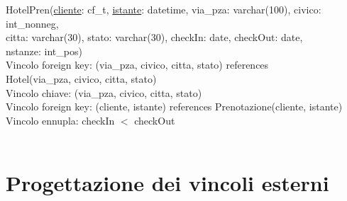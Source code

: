 \documentclass[a4paper,12pt]{report}
\begin{document}
      \hspace*{-0.75cm}
      HotelPren(\underline{cliente}: cf\_t, \underline{istante}: datetime, via\_pza: varchar(100), civico: int\_nonneg, \\
      \hspace*{2cm}citta: varchar(30), stato: varchar(30), checkIn: date, checkOut: date, \\
      \hspace*{2cm}nstanze: int\_pos) \\
      \hspace*{1cm} Vincolo foreign key: (via\_pza, civico, citta, stato) references \\
      \hspace*{2cm}Hotel(via\_pza, civico, citta, stato) \\
      \hspace*{1cm} Vincolo chiave: (via\_pza, civico, citta, stato) \\
      \hspace*{1cm} Vincolo foreign key: (cliente, istante) references Prenotazione(cliente, istante) \\
      \hspace*{1cm} Vincolo ennupla: checkIn $<$ checkOut \\ \\

    \chapter{Progettazione dei vincoli esterni}
\end{document}
